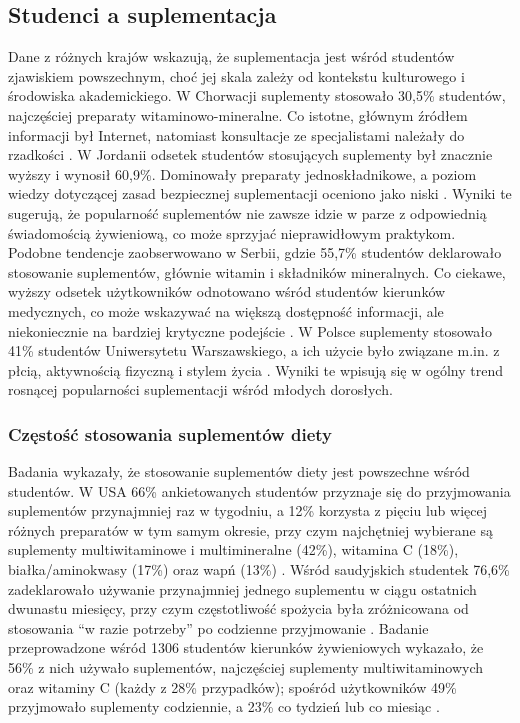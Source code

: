 \subsection{Studenci a suplementacja}

Dane z różnych krajów wskazują, że suplementacja jest wśród studentów zjawiskiem powszechnym, choć jej skala zależy od kontekstu kulturowego i środowiska akademickiego. W Chorwacji suplementy stosowało 30,5\% studentów, najczęściej preparaty witaminowo-mineralne. Co istotne, głównym źródłem informacji był Internet, natomiast konsultacje ze specjalistami należały do rzadkości \cite{croatia-knowledge-and-use}. W Jordanii odsetek studentów stosujących suplementy był znacznie wyższy i wynosił 60,9\%. Dominowały preparaty jednoskładnikowe, a poziom wiedzy dotyczącej zasad bezpiecznej suplementacji oceniono jako niski \cite{knowledge-and-use}. Wyniki te sugerują, że popularność suplementów nie zawsze idzie w parze z odpowiednią świadomością żywieniową, co może sprzyjać nieprawidłowym praktykom. Podobne tendencje zaobserwowano w Serbii, gdzie 55,7\% studentów deklarowało stosowanie suplementów, głównie witamin i składników mineralnych. Co ciekawe, wyższy odsetek użytkowników odnotowano wśród studentów kierunków medycznych, co może wskazywać na większą dostępność informacji, ale niekoniecznie na bardziej krytyczne podejście \cite{serbian-undergraduate}. W Polsce suplementy stosowało 41\% studentów Uniwersytetu Warszawskiego, a ich użycie było związane m.in. z płcią, aktywnością fizyczną i stylem życia \cite{diet-lifestyle}. Wyniki te wpisują się w ogólny trend rosnącej popularności suplementacji wśród młodych dorosłych.

\subsubsection{Częstość stosowania suplementów diety}

Badania wykazały, że stosowanie suplementów diety jest powszechne wśród studentów. W USA 66\% ankietowanych studentów przyznaje się do przyjmowania suplementów przynajmniej raz w tygodniu, a 12\% korzysta z pięciu lub więcej różnych preparatów w tym samym okresie, przy czym najchętniej wybierane są suplementy multiwitaminowe i multimineralne (42\%), witamina C (18\%), białka/aminokwasy (17\%) oraz wapń (13\%) \cite{lieberman2015patterns}. Wśród saudyjskich studentek 76,6\% zadeklarowało używanie przynajmniej jednego suplementu w ciągu ostatnich dwunastu miesięcy, przy czym częstotliwość spożycia była zróżnicowana od stosowania \enquote{w razie potrzeby} po codzienne przyjmowanie \cite{alfawaz2017prevalence}. Badanie przeprowadzone wśród 1306 studentów kierunków żywieniowych wykazało, że 56\% z nich używało suplementów, najczęściej suplementy multiwitaminowych oraz witaminy C (każdy z 28\% przypadków); spośród użytkowników 49\% przyjmowało suplementy codziennie, a 23\% co tydzień lub co miesiąc \cite{wiltgren2015micronutrient}.


